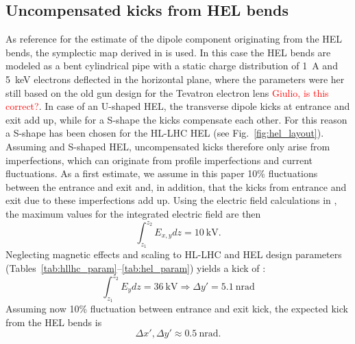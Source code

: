 \documentclass[%
 reprint,
 amsmath,amssymb,
 aps,
prstab,
]{revtex4-1}
\newcommand{\q}[2]{\ensuremath{#1\ \mathrm{#2}}} %
\begin{document}
\subsection{Uncompensated kicks from HEL bends}
\label{core:sec:1}
As reference for the estimate of the dipole component originating from the HEL bends, the symplectic map derived in \cite{hel_bends_stancari} is used. In this case the HEL bends are modeled as a bent cylindrical pipe with a static charge distribution of 1~A and 5~keV electrons deflected in the horizontal plane, where the parameters were her still based on the old gun design for the Tevatron electron lens \textcolor{red}{Giulio, is this correct?}. In case of an U-shaped HEL, the transverse dipole kicks at entrance and exit add up, while for a S-shape the kicks compensate each other. For this reason a S-shape has been chosen for the HL-LHC HEL (see Fig.~\ref{fig:hel_layout}). Assuming and S-shaped HEL, uncompensated kicks therefore only arise from imperfections, which can originate from profile imperfections and current fluctuations. As a first estimate, we assume in this paper 10\% fluctuations between the entrance and exit and, in addition, that the kicks from entrance and exit due to these imperfections add up. Using the electric field calculations in \cite{hel_bends_stancari}, the maximum values for the integrated electric field are then
\begin{equation}
\int_{z_1}^{z_2} E_{x,y} dz= 10 \ \mathrm{kV}.
\end{equation}
Neglecting magnetic effects and scaling to HL-LHC and HEL design parameters (Tables~\ref{tab:hllhc_param}--\ref{tab:hel_param}) yields a kick of \cite{md_sim_hel_res_ex_fitterer}:
\begin{equation}
\int_{z_1}^{z_2} E_{y} dz= 36 \ \mathrm{kV} \Rightarrow \Delta y'= \q{5.1}{nrad}
\end{equation}
Assuming now 10\% fluctuation between entrance and exit kick, the expected kick from the HEL bends is
\begin{equation}\label{eqn:kick_bends}
\Delta x', \Delta y'\approx \q{0.5}{nrad}.
\end{equation}
\end{document}
